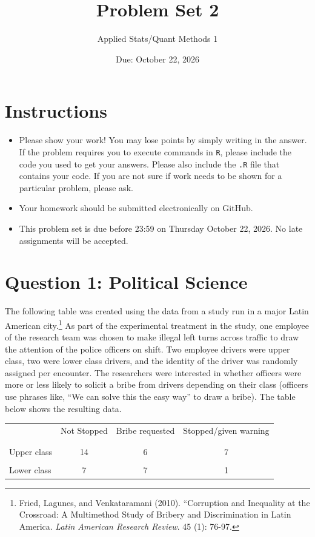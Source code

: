 \documentclass[12pt,letterpaper]{article}
\title{Problem Set 2}
\date{Due: October 22, 2026}
\author{Applied Stats/Quant Methods 1}
\begin{document}
	\maketitle
	\section*{Instructions}
\begin{itemize}
	\item Please show your work! You may lose points by simply writing in the answer. If the problem requires you to execute commands in \texttt{R}, please include the code you used to get your answers. Please also include the \texttt{.R} file that contains your code. If you are not sure if work needs to be shown for a particular problem, please ask.
	\item Your homework should be submitted electronically on GitHub.
	\item This problem set is due before 23:59 on Thursday October 22, 2026. No late assignments will be accepted.

\end{itemize}

	
	\vspace{.5cm}
	\section*{Question 1: Political Science}
		\vspace{.25cm}
	The following table was created using the data from a study run in a major Latin American city.\footnote{Fried, Lagunes, and Venkataramani (2010). ``Corruption and Inequality at the Crossroad: A Multimethod Study of Bribery and Discrimination in Latin America. \textit{Latin American Research Review}. 45 (1): 76-97.} As part of the experimental treatment in the study, one employee of the research team was chosen to make illegal left turns across traffic to draw the attention of the police officers on shift. Two employee drivers were upper class, two were lower class drivers, and the identity of the driver was randomly assigned per encounter. The researchers were interested in whether officers were more or less likely to solicit a bribe from drivers depending on their class (officers use phrases like, ``We can solve this the easy way'' to draw a bribe). The table below shows the resulting data.

\newpage
\begin{table}[h!]
	\centering
	\begin{tabular}{l | c c c }
		& Not Stopped & Bribe requested & Stopped/given warning \\
		\\[-1.8ex] 
		\hline \\[-1.8ex]
		Upper class &14 &6 &7 \\
		\\
		Lower class &7 &7 &1 \\
		\hline
	\end{tabular}
\end{table}
\end{document}
